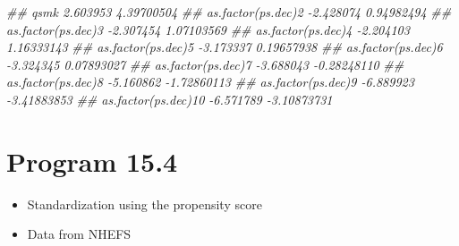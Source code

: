 \documentclass[
  10pt,
  a4paper,
]{book}
\newenvironment{Shaded}{\begin{snugshade}}{\end{snugshade}}
\newcommand{\DocumentationTok}[1]{\textcolor[rgb]{0.37,0.37,0.37}{\textit{#1}}}
\providecommand{\tightlist}{%
  \setlength{\itemsep}{0pt}\setlength{\parskip}{0pt}}
\begin{document}
\begin{Shaded}
\begin{Highlighting}[]
\DocumentationTok{\#\# qsmk                 2.603953  4.39700504}
\DocumentationTok{\#\# as.factor(ps.dec)2  {-}2.428074  0.94982494}
\DocumentationTok{\#\# as.factor(ps.dec)3  {-}2.307454  1.07103569}
\DocumentationTok{\#\# as.factor(ps.dec)4  {-}2.204103  1.16333143}
\DocumentationTok{\#\# as.factor(ps.dec)5  {-}3.173337  0.19657938}
\DocumentationTok{\#\# as.factor(ps.dec)6  {-}3.324345  0.07893027}
\DocumentationTok{\#\# as.factor(ps.dec)7  {-}3.688043 {-}0.28248110}
\DocumentationTok{\#\# as.factor(ps.dec)8  {-}5.160862 {-}1.72860113}
\DocumentationTok{\#\# as.factor(ps.dec)9  {-}6.889923 {-}3.41883853}
\DocumentationTok{\#\# as.factor(ps.dec)10 {-}6.571789 {-}3.10873731}
\end{Highlighting}
\end{Shaded}

\hypertarget{program-15.4}{%
\section{Program 15.4}\label{program-15.4}}

\begin{itemize}
\tightlist
\item
  Standardization using the propensity score
\item
  Data from NHEFS
\end{itemize}
\end{document}
